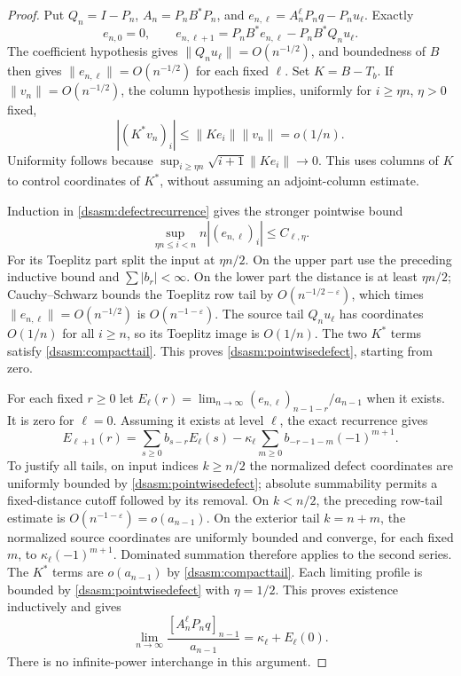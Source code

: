 \documentclass[11pt,letterpaper]{article}
\theoremstyle{remark}\newtheorem{remark}[theorem]{Remark}
\newcommand{\eps}{\varepsilon}\newcommand{\HH}{\mathcal H}\newcommand{\one}{\mathbf1}
\begin{document}
\begin{proof}
Put $Q_n=I-P_n$, $A_n=P_nB^*P_n$, and
$e_{n,\ell}=A_n^\ell P_nq-P_nu_\ell$. Exactly
\begin{equation}\label{dsasm:defectrecurrence}
 e_{n,0}=0,\qquad
 e_{n,\ell+1}=P_nB^*e_{n,\ell}-P_nB^*Q_nu_\ell.
\end{equation}
The coefficient hypothesis gives $\|Q_nu_\ell\|=O(n^{-1/2})$,
and boundedness of $B$ then gives
$\|e_{n,\ell}\|=O(n^{-1/2})$ for each fixed $\ell$.
Set $K=B-T_b$. If $\|v_n\|=O(n^{-1/2})$, the column hypothesis
implies, uniformly for $i\ge\eta n$, $\eta>0$ fixed,
\begin{equation}\label{dsasm:compacttail}
 |(K^*v_n)_i|\le\|Ke_i\|\|v_n\|=o(1/n).
\end{equation}
Uniformity follows because
$\sup_{i\ge\eta n}\sqrt{i+1}\|Ke_i\|\to0$.
This uses columns of $K$ to control coordinates of $K^*$, without
assuming an adjoint-column estimate.

Induction in \eqref{dsasm:defectrecurrence} gives the stronger pointwise bound
\begin{equation}\label{dsasm:pointwisedefect}
 \sup_{\eta n\le i<n}n|(e_{n,\ell})_i|\le C_{\ell,\eta}.
\end{equation}
For its Toeplitz part split the input at $\eta n/2$. On the upper
part use the preceding inductive bound and $\sum|b_r|<\infty$.
On the lower part the distance is at least $\eta n/2$;
Cauchy--Schwarz bounds the Toeplitz row tail by
$O(n^{-1/2-\eps})$, which times $\|e_{n,\ell}\|=O(n^{-1/2})$
is $O(n^{-1-\eps})$. The source tail $Q_nu_\ell$ has coordinates
$O(1/n)$ for all $i\ge n$, so its Toeplitz image is $O(1/n)$.
The two $K^*$ terms satisfy \eqref{dsasm:compacttail}. This proves
\eqref{dsasm:pointwisedefect}, starting from zero.

For each fixed $r\ge0$ let
$E_\ell(r)=\lim_{n\to\infty}(e_{n,\ell})_{n-1-r}/a_{n-1}$
when it exists. It is zero for $\ell=0$. Assuming it exists at
level $\ell$, the exact recurrence gives
\begin{equation}\label{dsasm:edgeprofile}
 E_{\ell+1}(r)=\sum_{s\ge0}b_{s-r}E_\ell(s)
       -\kappa_\ell\sum_{m\ge0}b_{-r-1-m}(-1)^{m+1}.
\end{equation}
To justify all tails, on input indices $k\ge n/2$ the normalized
defect coordinates are uniformly bounded by \eqref{dsasm:pointwisedefect};
absolute summability permits a fixed-distance cutoff followed by its
removal. On $k<n/2$, the preceding row-tail estimate is
$O(n^{-1-\eps})=o(a_{n-1})$. On the exterior tail $k=n+m$, the
normalized source coordinates are uniformly bounded and converge,
for each fixed $m$, to $\kappa_\ell(-1)^{m+1}$. Dominated summation
therefore applies to the second series. The $K^*$ terms are
$o(a_{n-1})$ by \eqref{dsasm:compacttail}. Each limiting profile is bounded
by \eqref{dsasm:pointwisedefect} with $\eta=1/2$.
This proves existence inductively and gives
\[
 \lim_{n\to\infty}\frac{[A_n^\ell P_nq]_{n-1}}{a_{n-1}}
       =\kappa_\ell+E_\ell(0).
\]
There is no infinite-power interchange in this argument.
\end{proof}
\end{document}
